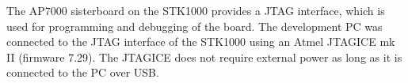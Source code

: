 The AP7000 sisterboard on the STK1000 provides a JTAG interface, which is used for programming and debugging of the board.
The development PC was connected to the JTAG interface of the STK1000 using an Atmel JTAGICE mk II (firmware 7.29).
The JTAGICE does not require external power as long as it is connected to the PC over USB.
